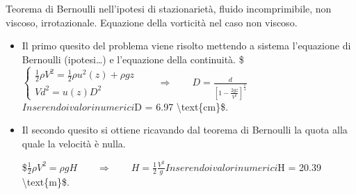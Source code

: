 \documentclass[letterpaper,10pt,italian]{jupyterBook}
\begin{document}
\sphinxAtStartPar
Teorema di Bernoulli nell’ipotesi di stazionarietà, fluido
incomprimibile, non viscoso, irrotazionale. Equazione della vorticità
nel caso non viscoso.
\begin{itemize}
\item {} 
\sphinxAtStartPar
Il primo quesito del problema viene risolto mettendo a sistema
l’equazione di Bernoulli (ipotesi…) e l’equazione della
continuità. \$\(\begin{cases}
  \frac{1}{2} \rho V^2  = \frac{1}{2}\rho u^2(z) + \rho g z\\
  V d^2 = u(z) D^2
\end{cases} \qquad \Rightarrow \qquad D = \frac{d}
{\displaystyle\left[1 - \frac{2 g z}{V^2}\right]^{\frac{1}{4}}}\)\(
Inserendo i valori numerici \)D = 6.97 \textbackslash{}text\{cm\}\$.

\item {} 
\sphinxAtStartPar
Il secondo quesito si ottiene ricavando dal teorema di Bernoulli la
quota alla quale la velocità è nulla.

\sphinxAtStartPar
\$\(\frac{1}{2} \rho V^2 = \rho g H \qquad \Rightarrow \qquad 
  H = \frac{1}{2} \frac{V^2}{g}\)\( Inserendo i valori numerici
\)H = 20.39 \textbackslash{}text\{m\}\$.

\end{itemize}

\sphinxstepscope
\end{document}
